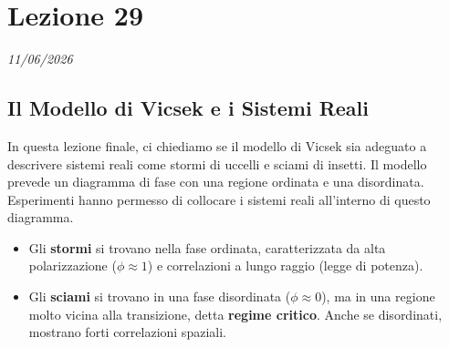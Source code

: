 \chapter{Lezione 29}
\label{capitolo_29}
\textit{11/06/2026}


\section{Il Modello di Vicsek e i Sistemi Reali}

In questa lezione finale, ci chiediamo se il modello di Vicsek sia adeguato a descrivere sistemi reali come stormi di uccelli e sciami di insetti. Il modello prevede un diagramma di fase con una regione ordinata e una disordinata. Esperimenti hanno permesso di collocare i sistemi reali all'interno di questo diagramma.
\begin{itemize}
    \item Gli \textbf{stormi} si trovano nella fase ordinata, caratterizzata da alta polarizzazione ($\phi \approx 1$) e correlazioni a lungo raggio (legge di potenza).
    \item Gli \textbf{sciami} si trovano in una fase disordinata ($\phi \approx 0$), ma in una regione molto vicina alla transizione, detta \textbf{regime critico}. Anche se disordinati, mostrano forti correlazioni spaziali.
\end{itemize}

